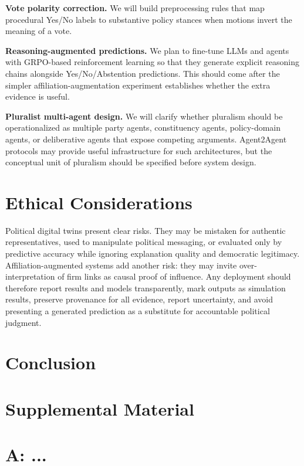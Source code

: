 \documentclass[letterpaper]{article}
\begin{document}
\textbf{Vote polarity correction.} We will build preprocessing rules that map procedural Yes/No labels to substantive policy stances when motions invert the meaning of a vote.

\textbf{Reasoning-augmented predictions.} We plan to fine-tune LLMs and agents with GRPO-based reinforcement learning so that they generate explicit reasoning chains alongside Yes/No/Abstention predictions. This should come after the simpler affiliation-augmentation experiment establishes whether the extra evidence is useful.

\textbf{Pluralist multi-agent design.} We will clarify whether pluralism should be operationalized as multiple party agents, constituency agents, policy-domain agents, or deliberative agents that expose competing arguments. Agent2Agent protocols may provide useful infrastructure for such architectures, but the conceptual unit of pluralism should be specified before system design.

\section{Ethical Considerations}

Political digital twins present clear risks. They may be mistaken for authentic representatives, used to manipulate political messaging, or evaluated only by predictive accuracy while ignoring explanation quality and democratic legitimacy. Affiliation-augmented systems add another risk: they may invite over-interpretation of firm links as causal proof of influence. Any deployment should therefore report results and models transparently, mark outputs as simulation results, preserve provenance for all evidence, report uncertainty, and avoid presenting a generated prediction as a substitute for accountable political judgment.

\section{Conclusion}




\appendix

\section*{Supplemental Material}

\section{A: ...}\label{ap:clusters}
\end{document}

